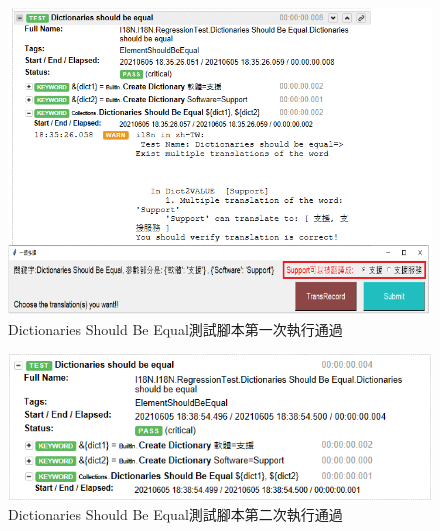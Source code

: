 \begin{figure}[H]
\includegraphics[width= \textwidth]{../論文截圖/4.1.3-2 dictionaries should be equal 1st run.png}
\caption{Dictionaries Should Be Equal測試腳本第一次執行通過}
\label{Dictionaries Should Be Equal測試腳本第一次執行通過}
\end{figure}

\begin{figure}[H]
\includegraphics[width= \textwidth]{../論文截圖/4.1.3-3 dictionaries should be equal 2nd run.png}
\caption{Dictionaries Should Be Equal測試腳本第二次執行通過}
\label{Dictionaries Should Be Equal測試腳本第二次執行通過}
\end{figure}

